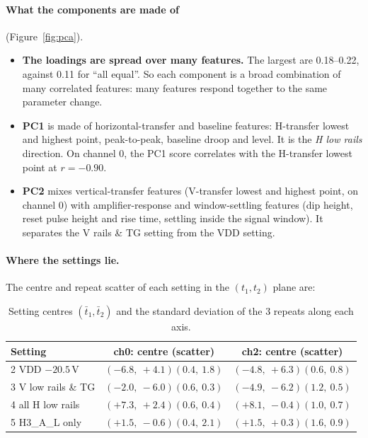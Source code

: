 \documentclass[10pt]{article}
\begin{document}
\paragraph{What the components are made of} (Figure~\ref{fig:pca}).
\begin{itemize}
\item \textbf{The loadings are spread over many features.} The largest are 0.18--0.22, against 0.11 for ``all equal''. So
  each component is a broad combination of many correlated features: many features respond together to the same
  parameter change.
\item \textbf{PC1} is made of horizontal-transfer and baseline features: H-transfer lowest and highest point,
  peak-to-peak, baseline droop and level. It is the \emph{H low rails} direction. On channel 0, the PC1 score correlates
  with the H-transfer lowest point at $r = -0.90$.
\item \textbf{PC2} mixes vertical-transfer features (V-transfer lowest and highest point, on channel 0) with
  amplifier-response and window-settling features (dip height, reset pulse height and rise time, settling inside the
  signal window). It separates the V rails \& TG setting from the VDD setting.
\end{itemize}

\paragraph{Where the settings lie.} The centre and repeat scatter of each setting in the $(t_1, t_2)$ plane are:

\begin{table}[H]
\centering
\small
\begin{tabular}{lcc}
\toprule
Setting & ch0: centre (scatter) & ch2: centre (scatter) \\
\midrule
2 VDD $-20.5$\,V & $(-6.8,\ +4.1)$\quad$(0.4,\ 1.8)$ & $(-4.8,\ +6.3)$\quad$(0.6,\ 0.8)$ \\
3 V low rails \& TG & $(-2.0,\ -6.0)$\quad$(0.6,\ 0.3)$ & $(-4.9,\ -6.2)$\quad$(1.2,\ 0.5)$ \\
4 all H low rails & $(+7.3,\ +2.4)$\quad$(0.6,\ 0.4)$ & $(+8.1,\ -0.4)$\quad$(1.0,\ 0.7)$ \\
5 H3\_A\_L only & $(+1.5,\ -0.6)$\quad$(0.4,\ 2.1)$ & $(+1.5,\ +0.3)$\quad$(1.6,\ 0.9)$ \\
\bottomrule
\end{tabular}
\caption{Setting centres $(\bar t_1, \bar t_2)$ and the standard deviation of the 3 repeats along each axis.}
\label{tab:pcacentres}
\end{table}
\end{document}
